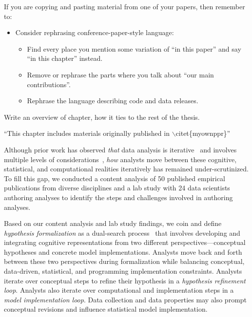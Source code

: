 If you are copying and pasting material from one of your papers, then remember to:
\begin{itemize}
    \item Consider rephrasing conference-paper-style language:
    \begin{itemize}
        \item Find every place you mention some variation of ``in this paper'' and say ``in this chapter'' instead.
        \item Remove or rephrase the parts where you talk about ``our main contributions''.
        \item Rephrase the language describing code and data releases.
    \end{itemize}
\end{itemize}

{\color{orange} Write an overview of chapter, how it ties to the rest of the thesis.}

{\color{orange} ``This chapter includes materials originally published in $\backslash$citet\{myownppr\}''}

Although prior work has observed \textit{that} data analysis is
iterative~\cite{liu2019paths,grolemund2014cognitive} and involves multiple
levels of considerations~\cite{liu2019understanding}, \textit{how} analysts move
between these cognitive, statistical, and computational realities iteratively
has remained under-scrutinized. To fill this gap, we conducted a content analysis of 50 published
empirical publications from diverse disciplines and a lab study with 24 data
scientists authoring analyses to identify the steps and challenges involved in
authoring analyses. 

Based on our content analysis and lab study findings, we coin and define
\textit{hypothesis formalization} as a dual-search process~\cite{klahr1988dual}
that involves developing and integrating cognitive representations from two
different perspectives---conceptual hypotheses and concrete model
implementations. Analysts move back and forth between these two perspectives
during formalization while balancing conceptual, data-driven, statistical, and
programming implementation constraints. Analysts iterate over conceptual steps
to refine their hypothesis in a \textit{hypothesis refinement loop}. Analysts
also iterate over computational and implementation steps in a \textit{model
implementation loop}. Data collection and data properties may also prompt
conceptual revisions and influence statistical model implementation.


